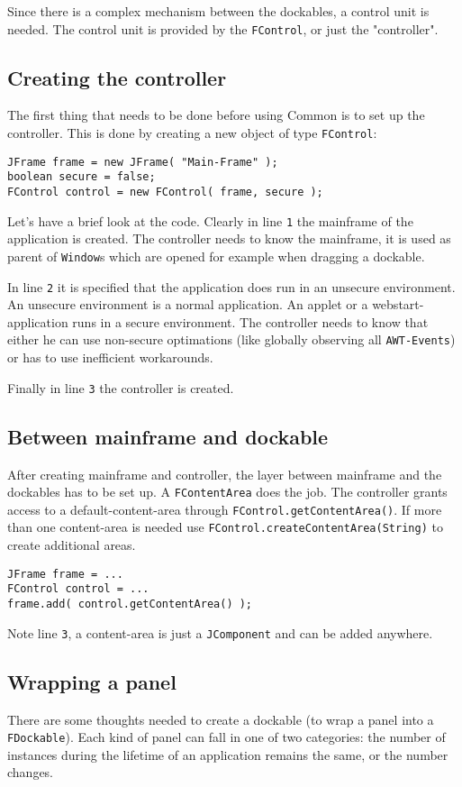 \documentclass[a4paper,10pt]{article}
\newcommand{\src}[1]{\lstinline[basicstyle=\ttfamily]|#1|}
\begin{document}
Since there is a complex mechanism between the dockables, a control unit is needed. The control unit is provided by the \src{FControl}, or just the "controller".

\subsection{Creating the controller}
The first thing that needs to be done before using Common is to set up the controller. This is done by creating a new object of type \src{FControl}:
\begin{lstlisting}
JFrame frame = new JFrame( "Main-Frame" );
boolean secure = false;
FControl control = new FControl( frame, secure );
\end{lstlisting}

Let's have a brief look at the code. Clearly in line \src{1} the mainframe of the application is created. The controller needs to know the mainframe, it is used as parent of \src{Window}s which are opened for example when dragging a dockable.

In line \src{2} it is specified that the application does run in an unsecure environment. An unsecure environment is a normal application. An applet or a webstart-application runs in a secure environment. The controller needs to know that either he can use non-secure optimations (like globally observing all \src{AWT-Events}) or has to use inefficient workarounds.

Finally in line \src{3} the controller is created.

\subsection{Between mainframe and dockable}
After creating mainframe and controller, the layer between mainframe and the dockables has to be set up. A \src{FContentArea} does the job. The controller grants access to a default-content-area through \src{FControl.getContentArea()}. If more than one content-area is needed use \src{FControl.createContentArea(String)} to create additional areas.
\begin{lstlisting}
JFrame frame = ...
FControl control = ...	
frame.add( control.getContentArea() );
\end{lstlisting}
Note line \src{3}, a content-area is just a \src{JComponent} and can be added anywhere.

\subsection{Wrapping a panel}
There are some thoughts needed to create a dockable (to wrap a panel into a \src{FDockable}). Each kind of panel can fall in one of two categories: the number of instances during the lifetime of an application remains the same, or the number changes.
\end{document}
